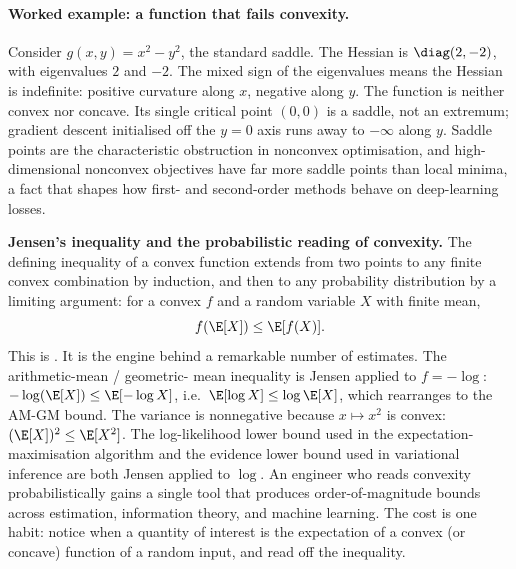 \paragraph{Worked example: a function that fails convexity.}
Consider $g(x, y) = x^{2} - y^{2}$, the standard saddle. The
Hessian is $\diag(2, -2)$, with eigenvalues $2$ and $-2$. The
mixed sign of the eigenvalues means the Hessian is indefinite:
positive curvature along $x$, negative along $y$. The function is
neither convex nor concave. Its single critical point $(0, 0)$ is
a saddle, not an extremum; gradient descent initialised off the
$y = 0$ axis runs away to $-\infty$ along $y$. Saddle points are
the characteristic obstruction in nonconvex optimisation, and
high-dimensional nonconvex objectives have far more saddle points
than local minima, a fact that shapes how first- and second-order
methods behave on deep-learning losses.

\begin{mastery}
\textbf{Jensen's inequality and the probabilistic reading of
convexity.} The defining inequality of a convex function extends
from two points to any finite convex combination by induction,
and then to any probability distribution by a limiting argument:
for a convex $f$ and a random variable $X$ with finite mean,
\[
f(\E[X]) \leq \E[f(X)].
\]
This is . It is the engine behind a
remarkable number of estimates. The arithmetic-mean / geometric-
mean inequality is Jensen applied to $f = -\log$: $-\log(\E[X])
\leq \E[-\log X]$, i.e.\ $\E[\log X] \leq \log \E[X]$, which
rearranges to the AM-GM bound. The variance is nonnegative because
$x \mapsto x^{2}$ is convex: $(\E[X])^{2} \leq \E[X^{2}]$. The
log-likelihood lower bound used in the expectation-maximisation
algorithm and the evidence lower bound used in variational
inference are both Jensen applied to $\log$. An engineer who reads
convexity probabilistically gains a single tool that produces
order-of-magnitude bounds across estimation, information theory,
and machine learning. The cost is one habit: notice when a
quantity of interest is the expectation of a convex (or concave)
function of a random input, and read off the inequality.
\end{mastery}



